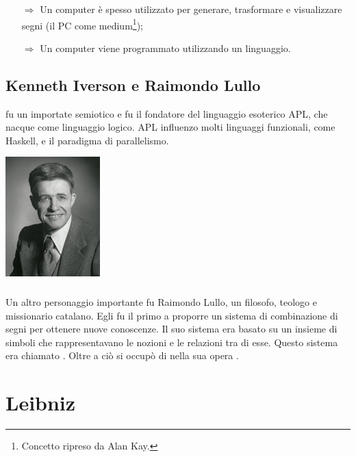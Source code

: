 \begin{itemize}
    \item [$\Rightarrow$] Un computer è spesso utilizzato per generare, trasformare e visualizzare segni (il PC come medium\footnote{Concetto ripreso da Alan Kay.});
    \item [$\Rightarrow$] Un computer viene programmato utilizzando un linguaggio.
\end{itemize}

\subsection{Kenneth Iverson e Raimondo Lullo}

 fu un importate semiotico e fu il fondatore del linguaggio esoterico APL, che nacque come linguaggio logico. APL influenzo molti linguaggi funzionali, come Haskell, e il paradigma di parallelismo.

\begin{center}
    \includegraphics[scale = 1]{images/iverson.jpg}
\end{center}

\subsubsection{}

Un altro personaggio importante fu Raimondo Lullo, un filosofo, teologo e missionario catalano. Egli fu il primo a proporre un sistema di combinazione di segni per ottenere nuove conoscenze. Il suo sistema era basato su un insieme di simboli che rappresentavano le nozioni e le relazioni tra di esse. Questo sistema era chiamato .
Oltre a ciò si occupò di  nella sua opera .

\section{Leibniz}

